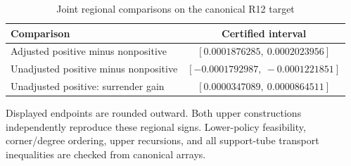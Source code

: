 \begin{table}[tbp]
\centering
\caption{Joint regional comparisons on the canonical R12 target}\label{tab:r12_region}
\begin{tabular}{lc}
\toprule
Comparison & Certified interval \\
\midrule
Adjusted positive minus nonpositive & $[0.0001876285,\ 0.0002023956]$ \\
Unadjusted positive minus nonpositive & $[-0.0001792987,\ -0.0001221851]$ \\
Unadjusted positive: surrender gain & $[0.0000347089,\ 0.0000864511]$ \\
\bottomrule
\end{tabular}
\par\smallskip
{\footnotesize Displayed endpoints are rounded outward. Both upper constructions independently reproduce these regional signs. Lower-policy feasibility, corner/degree ordering, upper recursions, and all support-tube transport inequalities are checked from canonical arrays.}
\end{table}
